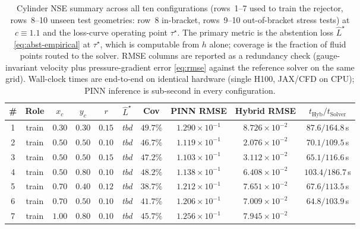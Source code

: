 \begin{table}[t]
  \caption{Cylinder NSE summary across all ten configurations
    (rows~1--7 used to train the rejector, rows~8--10 unseen test
    geometries: row~8 in-bracket, rows~9--10 out-of-bracket stress
    tests) at $c\equiv 1.1$ and the loss-curve operating point
    $\tau^\star$. The primary metric is the abstention loss
    $\widehat{L}^\star$ \eqref{eq:abst-empirical} at $\tau^\star$,
    which is computable from $h$ alone; coverage is the fraction of
    fluid points routed to the solver. RMSE columns are reported as
    a redundancy check (gauge-invariant velocity plus
    pressure-gradient error \eqref{eq:rmse} against the reference
    solver on the same grid). Wall-clock times are end-to-end on
    identical hardware (single H100, JAX/CFD on CPU); PINN inference
    is sub-second in every configuration.}
  \label{tab:cyl}
  \centering
  \small
  \setlength{\tabcolsep}{3.5pt}
  \begin{tabular}{cccccccccc}
    \toprule
    \# & Role & $x_c$ & $y_c$ & $r$ &
       $\widehat{L}^\star$ & Cov &
       PINN RMSE & Hybrid RMSE &
       $t_{\mathrm{Hyb}}/t_{\mathrm{Solver}}$ \\
    \midrule
    1 & train & $0.30$ & $0.30$ & $0.15$ &
        \textit{tbd} & $49.7\%$ &
        $1.290\!\times\!10^{-1}$ & $8.726\!\times\!10^{-2}$ &
        $87.6/164.8$\,s \\
    2 & train & $0.50$ & $0.50$ & $0.10$ &
        \textit{tbd} & $46.7\%$ &
        $1.119\!\times\!10^{-1}$ & $2.076\!\times\!10^{-2}$ &
        $70.1/109.5$\,s \\
    3 & train & $0.50$ & $0.50$ & $0.15$ &
        \textit{tbd} & $47.2\%$ &
        $1.103\!\times\!10^{-1}$ & $3.112\!\times\!10^{-2}$ &
        $65.1/116.6$\,s \\
    4 & train & $0.50$ & $0.80$ & $0.10$ &
        \textit{tbd} & $48.2\%$ &
        $1.138\!\times\!10^{-1}$ & $6.408\!\times\!10^{-2}$ &
        $103.4/186.7$\,s \\
    5 & train & $0.70$ & $0.40$ & $0.12$ &
        \textit{tbd} & $38.7\%$ &
        $1.212\!\times\!10^{-1}$ & $7.651\!\times\!10^{-2}$ &
        $67.6/113.5$\,s \\
    6 & train & $0.70$ & $0.50$ & $0.10$ &
        \textit{tbd} & $41.7\%$ &
        $1.206\!\times\!10^{-1}$ & $7.009\!\times\!10^{-2}$ &
        $64.8/103.9$\,s \\
    7 & train & $1.00$ & $0.80$ & $0.10$ &
        \textit{tbd} & $45.7\%$ &
        $1.256\!\times\!10^{-1}$ & $7.945\!\times\!10^{-2}$ &

\end{tabular}
\end{table}

